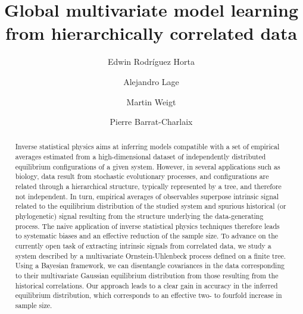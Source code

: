 \documentclass[preprint,amsmath,amssymb,superscriptaddress,showpacs,pre]{revtex4-1}
\begin{document}
\title{Global multivariate model learning from hierarchically correlated data}

\author{Edwin Rodr\'{i}guez Horta} 
%
\author{Alejandro Lage} 
%
\author{Martin Weigt} 
% 

\author{Pierre Barrat-Charlaix} 




\begin{abstract}
Inverse statistical physics aims at inferring models compatible with a set of empirical averages estimated from a high-dimensional dataset of independently distributed equilibrium configurations of a given system. However, in several applications such as biology, data result from stochastic evolutionary processes, and configurations are related through a hierarchical structure, typically represented by a tree, and therefore not independent. In turn, empirical averages of observables superpose intrinsic signal related to the equilibrium distribution of the studied system and spurious historical (or phylogenetic) signal resulting from the structure underlying the data-generating process. The naive application of inverse statistical physics techniques therefore leads to systematic biases and an effective reduction of the sample size. To advance on the currently open task of extracting intrinsic signals from correlated data, we study a system described by a multivariate Ornstein-Uhlenbeck process defined on a finite tree. Using a Bayesian framework, we can disentangle covariances in the data corresponding to their multivariate Gaussian equilibrium distribution from those resulting from the historical correlations. Our approach leads to a clear gain in accuracy in the inferred equilibrium distribution, which corresponds to an effective two- to fourfold increase in sample size.
\end{abstract}
\end{document}
